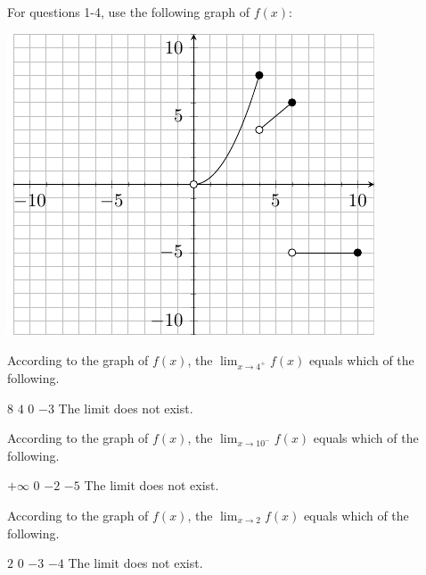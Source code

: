 \documentclass[11pt]{article}
\begin{document}
\begin{questions}
\begin{multiplechoice}{5}

For questions 1-4, use the following graph of $f(x)$:\\


\begin{minipage}{\linewidth}%
\centering
\makebox[\linewidth]{}
\includegraphics{exam1graph1.pdf}
\label{graph1exam1}%
\end{minipage}


\begin{questions}
\begin{multiplechoice}{5}

\question According to the graph of $f(x)$, the $\lim_{x\to 4^+}f(x) $ equals which of the following.
\begin{answers}{3}
\ans $8$
\ans $4$
\ans $0$
\ans $-3$
\ans The limit does not exist.
\end{answers}



\question According to the graph of $f(x)$, the $\lim_{x\to 10^-}f(x) $ equals which of the following.
\begin{answers}{3}
\ans $+\infty$
\ans $0$
\ans $-2$
\ans $-5$
\ans The limit does not exist.
\end{answers}


\question According to the graph of $f(x)$, the $\lim_{x\to 2}f(x) $ equals which of the following.
\begin{answers}{3}
\ans $2$
\ans $0$
\ans $-3$
\ans $-4$
\ans The limit does not exist.
\end{answers}


\end{multiplechoice}
\end{questions}
\end{multiplechoice}
\end{questions}
\end{document}
